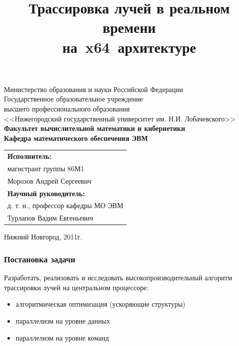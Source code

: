 \documentclass[utf8, 12pt]{beamer}
\title{Трассировка лучей в реальном времени \\ на~x64~архитектуре}
\author{}\date{}
\begin{document}
\begin{frame}
\begin{center}
{\tiny
Министерство образования и науки Российской Федерации\\ 
Государственное образовательное учреждение \\ 
высшего профессионального образования \\ 
<<Нижегородский государственный университет им. Н.И. Лобачевского>>\\
\bf{Факультет вычислительной математики и кибернетики \\
Кафедра математического обеспечения ЭВМ} \\
}
\end{center}
\titlepage
\vspace*{-1.75cm}
{\footnotesize
\begin{flushright}
\begin{tabular}{l}
\bf{Исполнитель}: \\ 
магистрант группы 86М1 \\
Морозов Андрей Сергеевич \\
\bf{Научный руководитель}: \\
д. т. н., профессор кафедры МО ЭВМ \\
Турлапов Вадим Евгеньевич
\end{tabular}
\end{flushright}
}
\vspace*{1.2cm}
\begin{center}
\footnotesize Нижний Новгород, 2011г.
\end{center}
\end{frame}

\begin{frame}
\frametitle{Постановка задачи}
Разработать, реализовать и исследовать высокопроизводительный алгоритм трассировки лучей на центральном процессоре:
\begin{itemize}
\item алгоритмическая оптимизация (ускоряющие структуры)
\item параллелизм на уровне данных
\item параллелизм на уровне команд
\end{itemize}
\end{frame}
\end{document}
